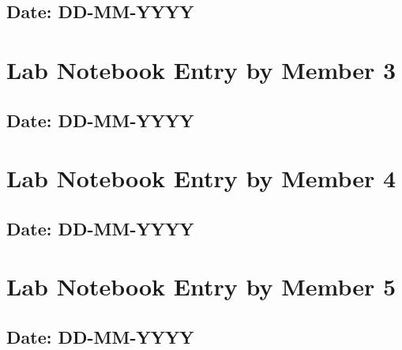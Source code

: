 \documentclass[12pt]{article}
\begin{document}
\subsection*{Date: DD-MM-YYYY}

\newpage

\section{Lab Notebook Entry by Member 3}
\subsection*{Date: DD-MM-YYYY}

\newpage

\section{Lab Notebook Entry by Member 4}
\subsection*{Date: DD-MM-YYYY}

\newpage

\section{Lab Notebook Entry by Member 5}
\subsection*{Date: DD-MM-YYYY}
\end{document}

